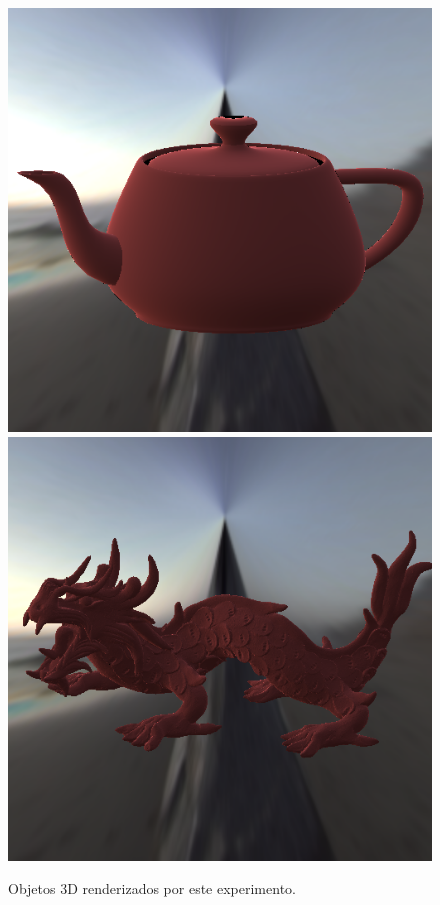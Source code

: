 \begin{figure}[H]
    \caption{\small{Objetos 3D renderizados por este experimento.}}\label{fig-minnaert-eqlang}
  \includegraphics[width=\linewidth]{./Imagens/brdfs/minnaert-teapot.png}
\endminipage\hfill
{}
  \includegraphics[width=\linewidth]{./Imagens/brdfs/minnaert-dragon.png}

\end{figure}
